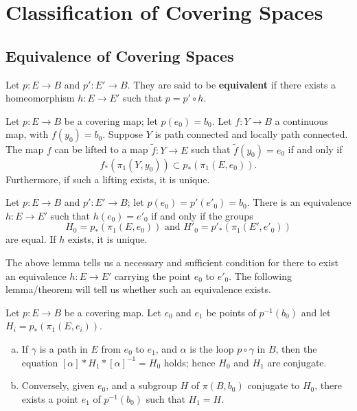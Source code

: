 \section{Classification of Covering Spaces}

\subsection{Equivalence of Covering Spaces}

\begin{definition}
Let $p \colon E \rightarrow B$ and $p' \colon E' \rightarrow B$. They are said to be \textbf{equivalent} if there exists a homeomorphism
$h \colon E \rightarrow E'$ such that $p = p' \circ h$. 
\end{definition}

\begin{lemma}
Let $p\colon E \rightarrow B$ be a covering map; let $p(e_0) = b_0$. Let $f\colon Y \rightarrow B$ a continuous map, with $f(y_0) = b_0$. 
Suppose $Y$ is path connected and locally path connected. The map $f$ can be lifted to a map
$\tilde{f} \colon  Y \rightarrow E$ such that $\tilde{f}(y_0) = e_0$ if and only if
\[
    f_{\ast}(\pi_1(Y, y_0)) \subset p_{\ast}(\pi_1(E, e_0)).
\]
Furthermore, if such a lifting exists, it is unique.
\end{lemma}

\begin{theorem}
Let $p \colon E \rightarrow B$ and $p' \colon E' \rightarrow B$; let $p(e_0) = p'(e'_0) = b_0$. There is an equivalence $h \colon E \rightarrow E'$ such that $h(e_0) = e'_0$ if and only if the groups
\[
    H_0 = p_*(\pi_1(E, e_0)) \text{ and } H'_0 = p'_*(\pi_1(E', e'_0))
\]
are equal. If $h$ exists, it is unique.
\end{theorem}

The above lemma tells us a necessary and sufficient condition for there to exist an equivalence $h \colon E \rightarrow E'$ carrying the point $e_0$ to $e'_0$. The following lemma/theorem will tell us whether such an equivalence exists. 

\begin{lemma}
Let $p \colon E \rightarrow B$ be a covering map. Let $e_0$ and $e_1$ be points of $p^{-1}(b_0)$ and let $H_i = p_*(\pi_1(E, e_i))$.
\begin{enumerate}[a)]
    \item If $\gamma$ is a path in $E$ from $e_0$ to $e_1$, and $\alpha$ is the loop $p \circ \gamma$ in $B$, then the equation $[\alpha] * H_1 * [\alpha]^{-1} = H_0$ holds; hence $H_0$ and $H_1$ are conjugate.
    \item Conversely, given $e_0$, and a subgroup $H$ of $\pi(B, b_0)$ conjugate to $H_0$, there exists a point $e_1$ of $p^{-1}(b_0)$ such that $H_1 = H$.
\end{enumerate}
\end{lemma}

